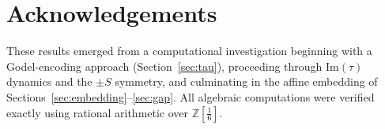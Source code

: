 \documentclass[12pt, a4paper]{amsart}
\theoremstyle{plain}
\theoremstyle{definition}
\theoremstyle{remark}
\newcommand{\Z}{\mathbb{Z}}
\newcommand{\Zs}{\Z[\tfrac{1}{6}]}
\begin{document}
\section*{Acknowledgements}

These results emerged from a computational investigation beginning with
a Godel-encoding approach (Section~\ref{sec:tau}), proceeding through
Im$(\tau)$ dynamics and the $\pm S$ symmetry, and culminating in the
affine embedding of Sections~\ref{sec:embedding}--\ref{sec:gap}.
All algebraic computations were verified exactly using rational
arithmetic over $\Zs$.


\end{document}
